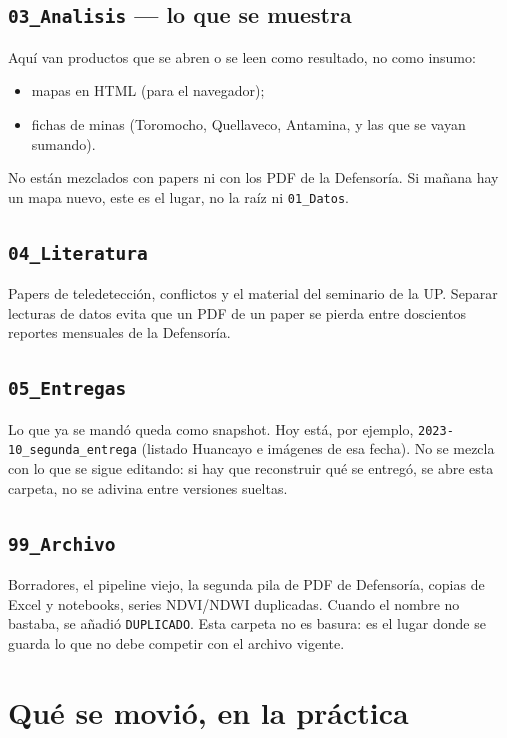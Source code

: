 \documentclass[11pt,a4paper]{article}
\begin{document}
\subsection{\texttt{03\_Analisis} --- lo que se muestra}

Aquí van productos que se abren o se leen como resultado, no como insumo:

\begin{itemize}
  \item mapas en HTML (para el navegador);
  \item fichas de minas (Toromocho, Quellaveco, Antamina, y las que se vayan sumando).
\end{itemize}

No están mezclados con papers ni con los PDF de la Defensoría. Si mañana hay un mapa nuevo, este es el lugar, no la raíz ni \texttt{01\_Datos}.

\subsection{\texttt{04\_Literatura}}

Papers de teledetección, conflictos y el material del seminario de la UP. Separar lecturas de datos evita que un PDF de un paper se pierda entre doscientos reportes mensuales de la Defensoría.

\subsection{\texttt{05\_Entregas}}

Lo que ya se mandó queda como snapshot. Hoy está, por ejemplo, \texttt{2023-10\_segunda\_entrega} (listado Huancayo e imágenes de esa fecha). No se mezcla con lo que se sigue editando: si hay que reconstruir qué se entregó, se abre esta carpeta, no se adivina entre versiones sueltas.

\subsection{\texttt{99\_Archivo}}

Borradores, el pipeline viejo, la segunda pila de PDF de Defensoría, copias de Excel y notebooks, series NDVI/NDWI duplicadas. Cuando el nombre no bastaba, se añadió \texttt{DUPLICADO}. Esta carpeta no es basura: es el lugar donde se guarda lo que no debe competir con el archivo vigente.

\section{Qué se movió, en la práctica}
\end{document}
